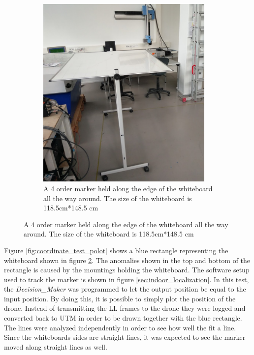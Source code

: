 \begin{figure}[H]
\begin{subfigure}[b]{0.45\textwidth}
        \includegraphics[width=0.95\textwidth]{graphics/coordinate_test_setup.png}
        \caption{A 4 order marker held along the edge of the whiteboard all the way around. The size of the whiteboard is 118.5cm*148.5 cm}
        \label{fig:convert_test}
    \end{subfigure}
\end{figure}

Figure \ref{fig:coordinate_test_polot} shows a blue 
rectangle representing the whiteboard shown in figure \ref{fig:convert_test}. The anomalies shown in the top and bottom of the 
rectangle is caused by the mountings holding the whiteboard. The software setup used to track the marker is shown in figure \ref{sec:indoor_localization}.
In this test, the \textit{Decision\_Maker} was programmed to let the output position be equal to the input position.
By doing this, it is possible to simply plot the position of the drone. Instead of transmitting the \ac{LL} frames to the drone they were logged and converted back to \ac{UTM} in order to be drawn together with the blue 
rectangle.
The lines were analyzed independently in order to see how well the fit a line. Since the whiteboards sides are straight lines, it was expected to see the marker moved along straight lines as well.


